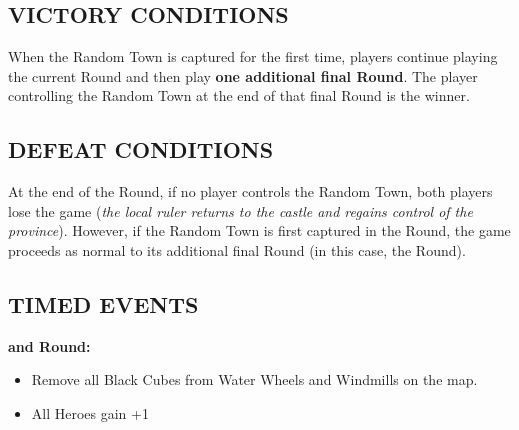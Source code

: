 \begin{multicols*}{2}
\subsection*{\MakeUppercase{Victory Conditions}}
When the Random Town is captured for the first time, players continue playing the current Round and then play \textbf{one additional final Round}.
The player controlling the Random Town at the end of that final Round is the winner.

\subsection*{\MakeUppercase{Defeat Conditions}}
At the end of the  Round, if no player controls the Random Town, both players lose the game (\textit{the local ruler returns to the castle and regains control of the province}).
However, if the Random Town is first captured in the  Round, the game proceeds as normal to its additional final Round (in this case, the  Round).

\subsection*{\MakeUppercase{Timed Events}}

  \textbf{ and  Round:}
\begin{itemize}
  \item Remove all Black Cubes from Water Wheels and Windmills on the map.
  \item All Heroes gain +1 
\end{itemize}

\end{multicols*}

